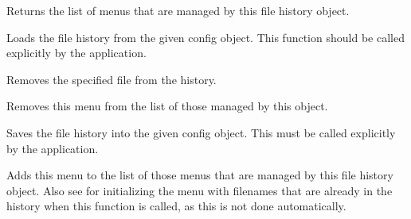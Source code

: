 
Returns the list of menus that are managed by this file history object.




\label{wxfilehistoryload}


Loads the file history from the given config object. This function should be called explicitly by the application.




\label{wxfilehistoryfromfilefromhistory}


Removes the specified file from the history.

\label{wxfilehistoryremovemenu}


Removes this menu from the list of those managed by this object.


\label{wxfilehistorysave}


Saves the file history into the given config object. This must be called
explicitly by the application.




\label{wxfilehistoryusemenu}


Adds this menu to the list of those menus that are managed by this file history object.
Also see  for
initializing the menu with filenames that are already in the history when this
function is called, as this is not done automatically.


